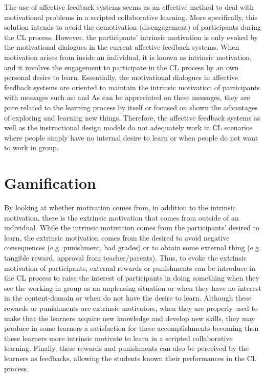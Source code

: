 The use of affective feedback systems seems as an effective method to deal with motivational problems in a scripted collaborative learning.
More specifically, this solution intends to avoid the demotivation (disengagement) of participants during the CL process.
However, the participants' intrinsic motivation is only evoked by the motivational dialogues in the current affective feedback systems.
When motivation arises from inside an individual, it is known as intrinsic motivation, and it involves the engagement to participate in the CL process by an own personal desire to learn.
Essentially, the motivational dialogues in affective feedback systems are oriented to maintain the intrinsic motivation of participants with messages such as:   and 
As can be appreciated on these messages, they are pure related to the learning process by itself or focused on shown the advantages of exploring and learning new things.
Therefore, the affective feedback systems as well as the instructional design models do not adequately work in CL scenarios where people simply have no internal desire to learn or when people do not want to work in group.


\section{Gamification}
\label{sec:gamification}

By looking at whether motivation comes from, in addition to the intrinsic motivation, there is the extrinsic motivation that comes from outside of an individual. 
While the intrinsic motivation comes from the participants' desired to learn, the extrinsic motivation comes from the desired to avoid negative consequences (e.g. punishment, bad grades) or to obtain some external thing (e.g. tangible reward, approval from teacher/parents).
Thus, to evoke the extrinsic motivation of participants, external rewards or punishments can be introduce in the CL process to raise the interest of participants in doing something when they see the working in group as an unpleasing situation or when they have no interest in the content-domain or when do not have the desire to learn.
Although these rewards or punishments are extrinsic motivators, when they are properly used to make that the learners acquire new knowledge and develop new skills, they may produce in some learners a satisfaction for these accomplishments becoming then these learners more intrinsic motivate to learn in a scripted collaborative learning.
Finally, these rewards and punishments can also be perceived by the learners as feedbacks, allowing the students known their performances in the CL process.

